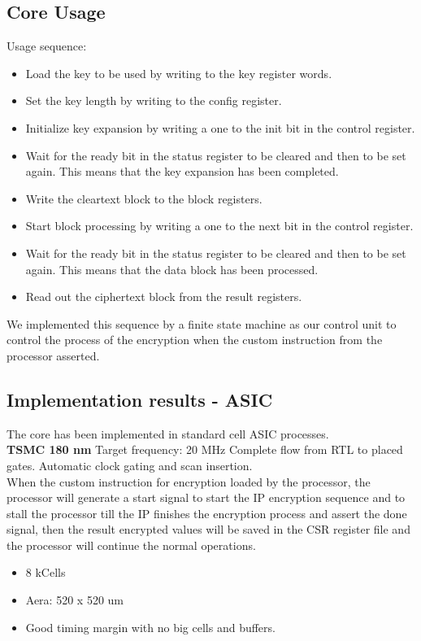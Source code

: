 \documentclass[../main.tex]{subfiles}
\begin{document}
\subsection*{Core Usage}
Usage sequence:
\begin{itemize}
    \item Load the key to be used by writing to the key register words.
    \item Set the key length by writing to the config register.
    \item Initialize key expansion by writing a one to the init bit in the control register.
    \item Wait for the ready bit in the status register to be cleared and then to be set again. This means that the key expansion has been completed.
    \item Write the cleartext block to the block registers.
    \item Start block processing by writing a one to the next bit in the control register.
    \item Wait for the ready bit in the status register to be cleared and then to be set again. This means that the data block has been processed.
    \item Read out the ciphertext block from the result registers.
\end{itemize}
We implemented this sequence by a finite state machine as our control unit to control the process of the encryption when the custom instruction from the processor asserted.
\subsection*{Implementation results - ASIC}
The core has been implemented in standard cell ASIC processes.\\
\textbf{TSMC 180 nm}
Target frequency: 20 MHz Complete flow from RTL to placed gates. Automatic clock gating and scan insertion.\\
When the custom instruction for encryption loaded by the processor, the processor will generate a start signal to start the IP encryption sequence and to stall the processor till the IP finishes the encryption process and assert the done signal, then the result encrypted values will be saved in the CSR register file and the processor will continue the normal operations.
\begin{itemize}
    \item 8 kCells
    \item Aera: 520 x 520 um
    \item Good timing margin with no big cells and buffers.
\end{itemize}
\end{document}
